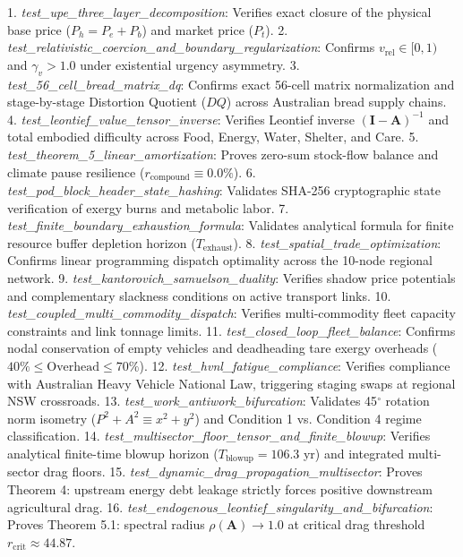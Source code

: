\documentclass[preprint,12pt,authoryear]{elsarticle}
\theoremstyle{definition}
\begin{document}
1.  \textit{test\_upe\_three\_layer\_decomposition}: Verifies exact closure of the physical base price ($P_h = P_e + P_b$) and market price ($P_t$).
2.  \textit{test\_relativistic\_coercion\_and\_boundary\_regularization}: Confirms $v_{\text{rel}} \in [0, 1)$ and $\gamma_v > 1.0$ under existential urgency asymmetry.
3.  \textit{test\_56\_cell\_bread\_matrix\_dq}: Confirms exact 56-cell matrix normalization and stage-by-stage Distortion Quotient ($DQ$) across Australian bread supply chains.
4.  \textit{test\_leontief\_value\_tensor\_inverse}: Verifies Leontief inverse $(\mathbf{I} - \mathbf{A})^{-1}$ and total embodied difficulty across Food, Energy, Water, Shelter, and Care.
5.  \textit{test\_theorem\_5\_linear\_amortization}: Proves zero-sum stock-flow balance and climate pause resilience ($r_{\text{compound}} \equiv 0.0\%$).
6.  \textit{test\_pod\_block\_header\_state\_hashing}: Validates SHA-256 cryptographic state verification of exergy burns and metabolic labor.
7.  \textit{test\_finite\_boundary\_exhaustion\_formula}: Validates analytical formula for finite resource buffer depletion horizon ($T_{\text{exhaust}}$).
8.  \textit{test\_spatial\_trade\_optimization}: Confirms linear programming dispatch optimality across the 10-node regional network.
9.  \textit{test\_kantorovich\_samuelson\_duality}: Verifies shadow price potentials and complementary slackness conditions on active transport links.
10. \textit{test\_coupled\_multi\_commodity\_dispatch}: Verifies multi-commodity fleet capacity constraints and link tonnage limits.
11. \textit{test\_closed\_loop\_fleet\_balance}: Confirms nodal conservation of empty vehicles and deadheading tare exergy overheads ($40\% \le \text{Overhead} \le 70\%$).
12. \textit{test\_hvnl\_fatigue\_compliance}: Verifies compliance with Australian Heavy Vehicle National Law, triggering staging swaps at regional NSW crossroads.
13. \textit{test\_work\_antiwork\_bifurcation}: Validates 45$^\circ$ rotation norm isometry ($P^2 + A^2 \equiv x^2 + y^2$) and Condition 1 vs. Condition 4 regime classification.
14. \textit{test\_multisector\_floor\_tensor\_and\_finite\_blowup}: Verifies analytical finite-time blowup horizon ($T_{\text{blowup}} = 106.3$ yr) and integrated multi-sector drag floors.
15. \textit{test\_dynamic\_drag\_propagation\_multisector}: Proves Theorem 4: upstream energy debt leakage strictly forces positive downstream agricultural drag.
16. \textit{test\_endogenous\_leontief\_singularity\_and\_bifurcation}: Proves Theorem 5.1: spectral radius $\rho(\mathbf{A}) \to 1.0$ at critical drag threshold $r_{\text{crit}} \approx 44.87$.
\end{document}

